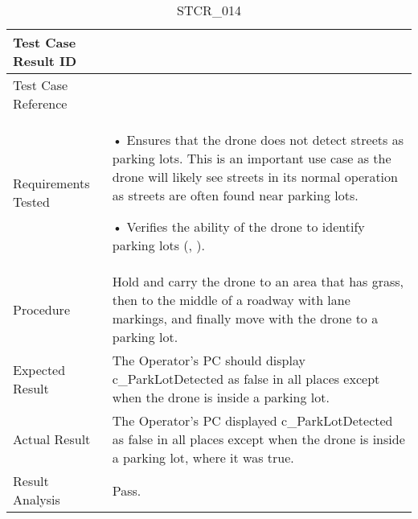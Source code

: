\documentclass[12pt, titlepage]{article}
\begin{document}
\begin{table}[!h]
\begin{center}
\caption {STCR\_014}
\label{tab:STCR_014}
\begin{tabular}{ | m{3.2cm} | m{12.2cm} | } 
\hline
Test Case Result ID & \nameref{tab:STCR_014} \\ 
\hline
Test Case Reference & \nameref{tab:STC_014}  \\ 
\hline
Requirements Tested & • Ensures that the drone does not detect streets as parking lots. This is an important use case as the drone will likely see streets in its normal operation as streets are often found near parking lots.

• Verifies the ability of the drone to identify parking lots (\nameref{GEN_001}, \nameref{SR_009}).
\\ 
\hline
Procedure & Hold and carry the drone to an area that has grass, then to the middle of a roadway with lane markings, and finally move with the drone to a parking lot. \\
\hline
Expected Result & The Operator’s PC should display c_ParkLotDetected as false in all places except when the drone is inside a parking lot.   \\ 
\hline
Actual Result &  The Operator’s PC displayed c_ParkLotDetected as false in all
places except when the drone is inside a parking lot, where it was true.  \\
\hline
Result Analysis & Pass.  \\ 
\hline
\end{tabular}
\end{center}
\end{table}
\end{document}
